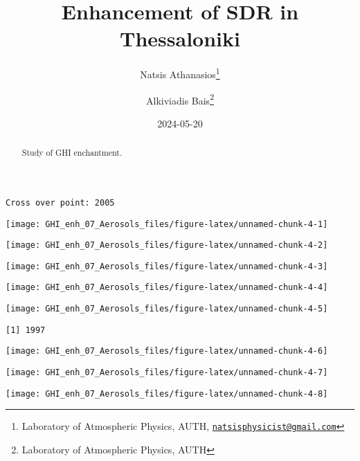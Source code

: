 \documentclass[
  10pt,
  a4paper,oneside]{article}
\title{Enhancement of SDR in Thessaloniki}
\author{Natsis Athanasios\footnote{Laboratory of Atmospheric Physics, AUTH, \href{mailto:natsisphysicist@gmail.com}{\nolinkurl{natsisphysicist@gmail.com}}} \and Alkiviadis Bais\footnote{Laboratory of Atmospheric Physics, AUTH}}
\date{2024-05-20}
\begin{document}
\maketitle
\begin{abstract}
Study of GHI enchantment.
\end{abstract}

{
\hypersetup{linkcolor=}
\setcounter{tocdepth}{4}
\tableofcontents
}
\begin{verbatim}
Cross over point: 2005 
\end{verbatim}

\begin{center}\texttt{[image: GHI\_enh\_07\_Aerosols\_files/figure-latex/unnamed-chunk-4-1]} \end{center}

\begin{center}\texttt{[image: GHI\_enh\_07\_Aerosols\_files/figure-latex/unnamed-chunk-4-2]} \end{center}

\begin{center}\texttt{[image: GHI\_enh\_07\_Aerosols\_files/figure-latex/unnamed-chunk-4-3]} \end{center}

\begin{center}\texttt{[image: GHI\_enh\_07\_Aerosols\_files/figure-latex/unnamed-chunk-4-4]} \end{center}

\begin{center}\texttt{[image: GHI\_enh\_07\_Aerosols\_files/figure-latex/unnamed-chunk-4-5]} \end{center}

\begin{verbatim}
[1] 1997
\end{verbatim}

\begin{center}\texttt{[image: GHI\_enh\_07\_Aerosols\_files/figure-latex/unnamed-chunk-4-6]} \end{center}

\begin{center}\texttt{[image: GHI\_enh\_07\_Aerosols\_files/figure-latex/unnamed-chunk-4-7]} \end{center}

\begin{center}\texttt{[image: GHI\_enh\_07\_Aerosols\_files/figure-latex/unnamed-chunk-4-8]} \end{center}
\end{document}
